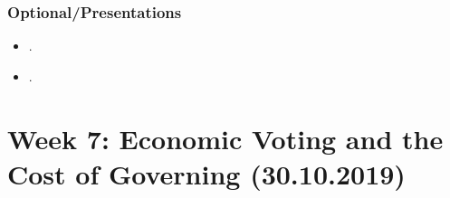 \documentclass[abstract=on,parskip=full,headings=standardclasses,fontsize=11pt,paper=a4]{scrartcl}
\begin{document}
\subsubsection*{Optional/Presentations}
\begin{itemize}
\item {}.
\item {}.
\end{itemize}

\section{Week 7: Economic Voting and the Cost of Governing (30.10.2019)}
\end{document}
